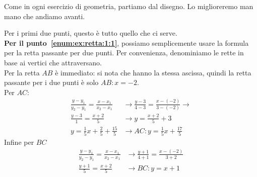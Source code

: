 Come in ogni esercizio di geometria, partiamo dal disegno. Lo miglioreremo man mano che andiamo 
avanti.
\begin{center}
\end{center}

Per i primi due punti, questo è tutto quello che ci serve.\\
\textbf{Per il punto~\ref{enum:ex:retta:1:1}}, possiamo semplicemente usare la formula per la retta 
passante per due punti. Per convenienza, denominiamo le rette in base ai vertici che attraversano.\\
Per la retta $AB$ è immediato: si nota che hanno la stessa ascissa, quindi la retta passante per i due
punti è solo $\boxed{AB: x = -2}$.\\ [\baselineskip]
Per $AC$:
\begin{align*}
  \frac{y-y_1}{y_2-y_1} = \frac{x-x_1}{x_2-x_1} &\rightarrow
  \frac{y-3}{4-3} = \frac{x-(-2)}{3-(-2)} \rightarrow\\
  \frac{y-3}{1} = \frac{x+2}{5} &\rightarrow y = \frac{x+2}{5} + 3\\
  y = \frac{1}{5}x + \frac{2}{5} + \frac{15}{5} &\rightarrow \boxed{AC: y = \frac{1}{5}x + \frac{17}{5}}
\end{align*}
Infine per $BC$
\begin{align*}
  \frac{y-y_1}{y_2-y_1} = \frac{x-x_1}{x_2-x_1} &\rightarrow
  \frac{y+1}{4+1} = \frac{x-(-2)}{3+2}\\
  \frac{y+1}{5} = \frac{x+2}{5} &\rightarrow \boxed{BC: y = x + 1}
\end{align*}

